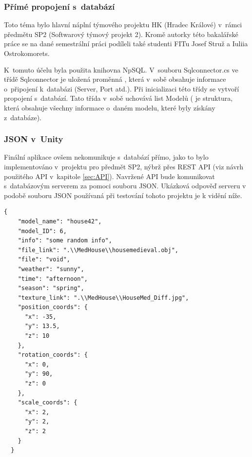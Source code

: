 \documentclass[thesis=B,czech]{FITthesis}[2012/06/26]
\begin{document}
\subsubsection{Přímé propojení s~databází}
 Toto téma bylo hlavní náplní týmového projektu HK (Hradec Králové) v~rámci předmětu SP2 (Softwarový týmový projekt 2). Kromě autorky této bakalářské práce se na dané semestrální práci podíleli také studenti FITu Josef Struž a Iuliia Ostrokomorets. 
   
    K~tomuto účelu byla použita knihovna NpSQL. V~souboru Sqlconnector.cs ve třídě Sqlconnector je uložená proměnná , která v~sobě obsahuje informace o~připojení k~databázi (Server, Port atd.). Při inicializaci této třídy se vytvoří propojení s~databází. Tato třída v~sobě uchovává list Modelů ( je struktura, která obsahuje všechny informace o~daném modelu, které byly získány z~databáze). 
    
    \subsubsection{JSON v~Unity}
    \label{sec:json}
	
	Finální aplikace ovšem nekomunikuje s~databází přímo, jako to bylo implementováno v~projektu pro předmět SP2, nýbrž přes REST API (viz návrh použitého API v~kapitole \ref{sec:API}). Navržené API bude komunikovat s~databázovým serverem za pomoci souboru JSON. Ukázková odpověď serveru v podobě souboru JSON používaná při testování tohoto projektu je k vidění níže.
	
	\begin{minipage}[c]{0.95\textwidth}
	\begin{lstlisting}[frame=single]
	{
    "model_name": "house42",
    "model_ID": 6,
    "info": "some random info",
    "file_link": ".\\MedHouse\\housemedieval.obj",
    "file": "void",
    "weather": "sunny",
    "time": "afternoon",
    "season": "spring",
    "texture_link": ".\\MedHouse\\HouseMed_Diff.jpg",
    "position_coords": {
      "x": -35,
      "y": 13.5,
      "z": 10
    },
    "rotation_coords": {
      "x": 0,
      "y": 90,
      "z": 0
    },
    "scale_coords": {
      "x": 2,
      "y": 2,
      "z": 2
    }
  }

\end{lstlisting}
\end{minipage}
	
\end{document}

